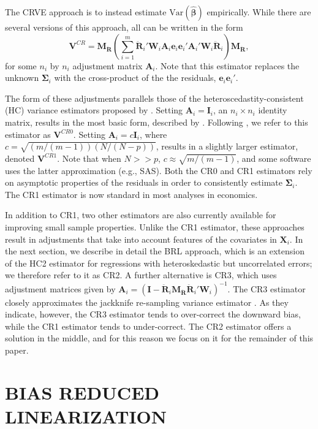 \documentclass[12pt]{article}\usepackage[]{graphicx}\usepackage[]{color}
\newcommand{\Var}{\text{Var}}
\newcommand{\bm}{\mathbf}
\newcommand{\bs}{\boldsymbol}
\begin{document}
The CRVE approach is to instead estimate $\Var\left(\bs{\hat\beta}\right)$ empirically. 
While there are several versions of this approach, all can be written in the form
\begin{equation}
\label{eq:V_small}
\bm{V}^{CR} = \bm{M_{\ddot{R}}}\left(\sum_{i=1}^m \bm{\ddot{R}}_i'\bm{W}_i \bm{A}_i \bm{e}_i \bm{e}_i' \bm{A}_i' \bm{W}_i \bm{\ddot{R}}_i\right) \bm{M_{\ddot{R}}},
\end{equation}
for some $n_i$ by $n_i$ adjustment matrix $\bm{A}_i$. 
Note that this estimator replaces the unknown $\bm\Sigma_i$ with the cross-product of the the residuals, $\bm{e}_i \bm{e}_i'$. 

The form of these adjustments parallels those of the heteroscedastity-consistent (HC) variance estimators proposed by \citet*{MacKinnon1985some}. 
Setting $\bm{A}_i = \bm{I}_i$, an $n_i \times n_i$ identity matrix, results in the most basic form, described by \citet{Liang1986longitudinal}. 
Following \citet{Cameron2015practitioners}, we refer to this estimator as $\bm{V}^{CR0}$. 
Setting $\bm{A}_i = c\bm{I}_i$, where $c = \sqrt{(m/(m-1))(N/(N - p))}$, results in a slightly larger estimator, denoted $\bm{V}^{CR1}$.
Note that when $N >> p$, $c \approx \sqrt{m/(m-1)}$, and some software uses the latter approximation (e.g., SAS).
Both the CR0 and CR1 estimators rely on asymptotic properties of the residuals in order to consistently estimate $\bs\Sigma_i$. 
The CR1 estimator is now standard in most analyses in economics.

In addition to CR1, two other estimators are also currently available for improving small sample properties. 
Unlike the CR1 estimator, these approaches result in adjustments that take into account features of the covariates in $\bm{X}_i$. 
In the next section, we describe in detail the BRL approach, which is an extension of the HC2 estimator for regressions with heteroskedastic but uncorrelated errors; we therefore refer to it as CR2. 
A further alternative is CR3, which uses adjustment matrices given by $\bm{A}_i = \left(\bm{I} - \bm{\ddot{R}}_i \bm{M_{\ddot{R}}}\bm{\ddot{R}}_i'\bm{W}_i\right)^{-1}$. The CR3 estimator closely approximates the jackknife re-sampling variance estimator \citep{Bell2002bias, Mancl2001covariance}. 
As they indicate, however, the CR3 estimator tends to over-correct the downward bias, while the CR1 estimator tends to under-correct. 
The CR2 estimator offers a solution in the middle, and for this reason we focus on it for the remainder of this paper. 

\section{BIAS REDUCED LINEARIZATION}
\label{sec:BRL}
\end{document}
